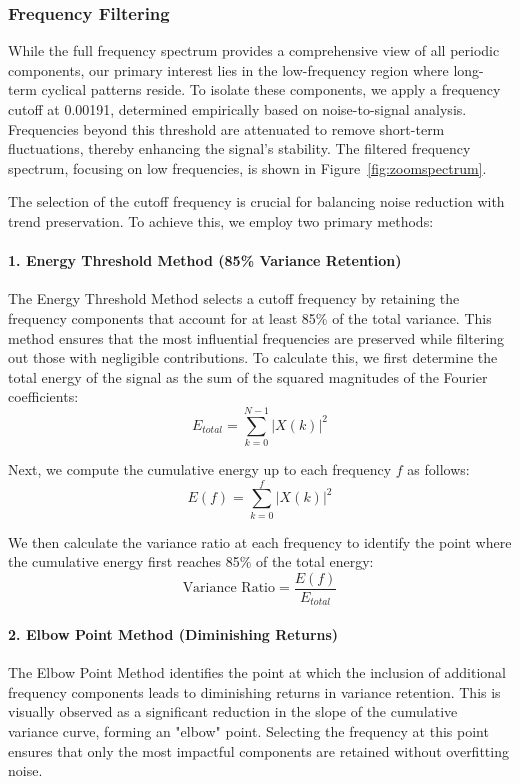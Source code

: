 \documentclass[12pt]{article}
\begin{document}
\subsubsection{Frequency Filtering}
While the full frequency spectrum provides a comprehensive view of all periodic components, our primary interest lies in the low-frequency region where long-term cyclical patterns reside. To isolate these components, we apply a frequency cutoff at 0.00191, determined empirically based on noise-to-signal analysis. Frequencies beyond this threshold are attenuated to remove short-term fluctuations, thereby enhancing the signal's stability. The filtered frequency spectrum, focusing on low frequencies, is shown in Figure~\ref{fig:zoomspectrum}.

The selection of the cutoff frequency is crucial for balancing noise reduction with trend preservation. To achieve this, we employ two primary methods:

\paragraph{1. Energy Threshold Method (85\% Variance Retention)}
The Energy Threshold Method selects a cutoff frequency by retaining the frequency components that account for at least 85\% of the total variance. This method ensures that the most influential frequencies are preserved while filtering out those with negligible contributions. To calculate this, we first determine the total energy of the signal as the sum of the squared magnitudes of the Fourier coefficients:
\[
E_{total} = \sum_{k=0}^{N-1} |X(k)|^2
\]

Next, we compute the cumulative energy up to each frequency \(f\) as follows:
\[
E(f) = \sum_{k=0}^{f} |X(k)|^2
\]

We then calculate the variance ratio at each frequency to identify the point where the cumulative energy first reaches 85\% of the total energy:
\[
\text{Variance Ratio} = \frac{E(f)}{E_{total}}
\]

\paragraph{2. Elbow Point Method (Diminishing Returns)}
The Elbow Point Method identifies the point at which the inclusion of additional frequency components leads to diminishing returns in variance retention. This is visually observed as a significant reduction in the slope of the cumulative variance curve, forming an "elbow" point. Selecting the frequency at this point ensures that only the most impactful components are retained without overfitting noise.
\end{document}
